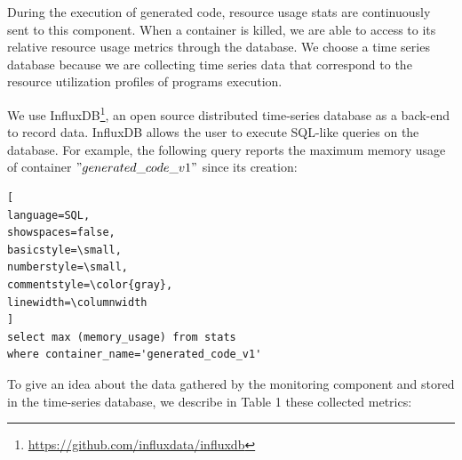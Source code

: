 During the execution of generated code, resource usage stats are continuously sent to this component. When a container is killed, we are able to access to its relative resource usage metrics through the database. We choose a time series database because we are collecting time series data that correspond to the resource utilization profiles of programs execution.

We use InfluxDB\footnote{\url{https://github.com/influxdata/influxdb}}, an open source distributed time-series database as a back-end to record data. InfluxDB allows the user to execute SQL-like queries on the database. For example, the following query reports the maximum memory usage of container $"generated\_code\_v1"$ since its creation:

\begin{lstlisting}[
language=SQL,
showspaces=false,
basicstyle=\small,
numberstyle=\small,
commentstyle=\color{gray},
linewidth=\columnwidth
]
select max (memory_usage) from stats 
where container_name='generated_code_v1'
\end{lstlisting}
To give an idea about the data gathered by the monitoring component and stored in the time-series database, we describe in Table 1 these collected metrics:
\begin{table}[h]
	\begin{center}
		
	\end{center}
	\caption {Resource usage metrics recorded in InfluxDB}
\end{table}

